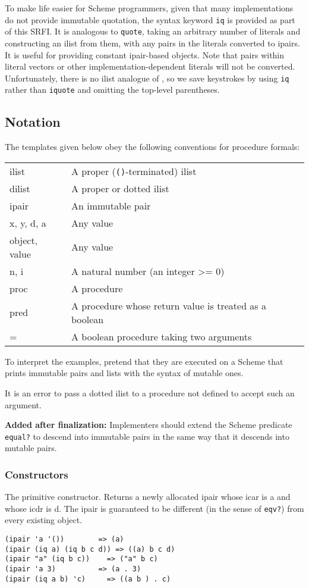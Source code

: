 To make life easier for Scheme programmers, given that many
implementations do not provide immutable quotation, the syntax keyword
\texttt{iq} is provided as part of this SRFI. It is analogous to
\texttt{quote}, taking an arbitrary number of literals and constructing
an ilist from them, with any pairs in the literals converted to ipairs.
It is useful for providing constant ipair-based objects. Note that pairs
within literal vectors or other implementation-dependent literals will
not be converted. Unfortunately, there is no ilist analogue of
\texttt{\textquotesingle{}}, so we save keystrokes by using \texttt{iq}
rather than \texttt{iquote} and omitting the top-level parentheses.

\subsection{Notation}

The templates given below obey the following conventions for procedure
formals:

\begin{tabular}{ll}
ilist & A proper (\texttt{()}-terminated) ilist\tabularnewline
dilist & A proper or dotted ilist\tabularnewline
ipair & An immutable pair\tabularnewline
x, y, d, a & Any value\tabularnewline
object, value & Any value\tabularnewline
n, i & A natural number (an integer \textgreater{}= 0)\tabularnewline
proc & A procedure\tabularnewline
pred & A procedure whose return value is treated as a
boolean\tabularnewline
= & A boolean procedure taking two arguments\tabularnewline
\end{tabular}

To interpret the examples, pretend that they are executed on a Scheme
that prints immutable pairs and lists with the syntax of mutable ones.

It is an error to pass a dotted ilist to a procedure not defined to
accept such an argument.

\textbf{Added after finalization:} Implementers should extend the Scheme
predicate \texttt{equal?} to descend into immutable pairs in the same
way that it descends into mutable pairs.

\subsubsection{Constructors}

\begin{entry}{%
  }

  The
    primitive constructor. Returns a newly allocated ipair whose icar
    is a and whose icdr is d. The ipair is guaranteed to be different
    (in the sense of \texttt{eqv?}) from every existing object.

\begin{verbatim}
(ipair 'a '())        => (a)
(ipair (iq a) (iq b c d)) => ((a) b c d)
(ipair "a" (iq b c))    => ("a" b c)
(ipair 'a 3)          => (a . 3)
(ipair (iq a b) 'c)     => ((a b ) . c)
\end{verbatim}
  \end{entry}
  

